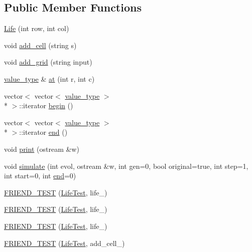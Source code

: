 \subsection*{Public Member Functions}
\begin{DoxyCompactItemize}
\item 
\hyperlink{classLife_a9f6c515a2ba1a58bf895f657e502fe4e}{Life} (int row, int col)
\item 
void \hyperlink{classLife_af739ec50e5cc8090f75320a65cdd3875}{add\-\_\-cell} (string s)
\item 
void \hyperlink{classLife_a88317b18115eb5239cafc51c05ae1cfc}{add\-\_\-grid} (string input)
\item 
\hyperlink{classLife_aa51e5c8b3a0acdfa99fc9ea8c2b550f8}{value\-\_\-type} \& \hyperlink{classLife_a3adec94040b9767e69c91716d8b5fd40}{at} (int r, int c)
\item 
vector$<$ vector$<$ \hyperlink{classLife_aa51e5c8b3a0acdfa99fc9ea8c2b550f8}{value\-\_\-type} $>$\\*
 $>$\-::iterator \hyperlink{classLife_aac8bd559ed3684cb8a8eded2b62864d7}{begin} ()
\item 
vector$<$ vector$<$ \hyperlink{classLife_aa51e5c8b3a0acdfa99fc9ea8c2b550f8}{value\-\_\-type} $>$\\*
 $>$\-::iterator \hyperlink{classLife_a46a876bb53c181aba882aa52860d9dfb}{end} ()
\item 
void \hyperlink{classLife_afa17f66a0e1cbac5931eb77f3b27eb0b}{print} (ostream \&w)
\item 
void \hyperlink{classLife_ae2b61b3dd5ffcf4a05278ffc8e142e97}{simulate} (int evol, ostream \&w, int gen=0, bool original=true, int step=1, int start=0, int \hyperlink{classLife_a46a876bb53c181aba882aa52860d9dfb}{end}=0)
\item 
\hyperlink{classLife_abd761920e2cedaed7551628eb72e8014}{F\-R\-I\-E\-N\-D\-\_\-\-T\-E\-S\-T} (\hyperlink{classLife_ac09a12090bbd959da33d05c9c8bfa744}{Life\-Test}, life\-\_)
\item 
\hyperlink{classLife_a9dcbf9af888061ed692a338d288c564a}{F\-R\-I\-E\-N\-D\-\_\-\-T\-E\-S\-T} (\hyperlink{classLife_ac09a12090bbd959da33d05c9c8bfa744}{Life\-Test}, life\-\_)
\item 
\hyperlink{classLife_a5a89cc37e140e81861b6bffc4f6acfae}{F\-R\-I\-E\-N\-D\-\_\-\-T\-E\-S\-T} (\hyperlink{classLife_ac09a12090bbd959da33d05c9c8bfa744}{Life\-Test}, life\-\_)
\item 
\hyperlink{classLife_a4ce4c0a32765db6236d901e70b4d776d}{F\-R\-I\-E\-N\-D\-\_\-\-T\-E\-S\-T} (\hyperlink{classLife_ac09a12090bbd959da33d05c9c8bfa744}{Life\-Test}, add\-\_\-cell\-\_)

\end{DoxyCompactItemize}
